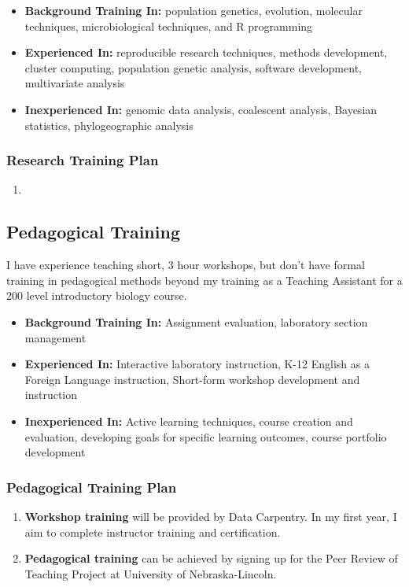 \documentclass[12pt,letterpaper]{article}
\begin{document}
\begin{itemize}
  \item \textbf{Background Training In: } population genetics, evolution, molecular techniques, microbiological techniques, and R programming
  \item \textbf{Experienced In: } reproducible research techniques, methods development, cluster computing, population genetic analysis, software development, multivariate analysis
  \item \textbf{Inexperienced In: } genomic data analysis, coalescent analysis,
  Bayesian statistics, phylogeographic analysis
\end{itemize}

\subsubsection{Research Training Plan}

\begin{enumerate}
  \item 
\end{enumerate}


\subsection{Pedagogical Training}

I have experience teaching short, 3 hour workshops, but don't have formal training in pedagogical methods beyond my training as a Teaching Assistant for a 200 level introductory biology course. 

\begin{itemize}
  \item \textbf{Background Training In: } Assignment evaluation, laboratory section management
  \item \textbf{Experienced In: } Interactive laboratory instruction, K-12 English as a Foreign Language instruction, Short-form workshop development and
  instruction
  \item \textbf{Inexperienced In: } Active learning techniques, course creation and evaluation, developing goals for specific learning outcomes, course portfolio development
\end{itemize}

\subsubsection{Pedagogical Training Plan}

\begin{enumerate}
  \item \textbf{Workshop training} will be provided by Data Carpentry. In my first year, I aim to complete instructor training and certification.
  \item \textbf{Pedagogical training} can be achieved by signing up for the Peer Review of Teaching Project at University of Nebraska-Lincoln. 
\end{enumerate}
\end{document}
